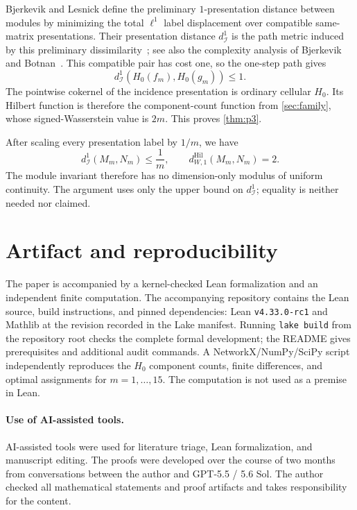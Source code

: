 \documentclass[11pt]{article}
\theoremstyle{definition}
\newcommand{\1}{\mathbf{1}}
\newcommand{\Hil}{\mathrm{Hil}}
\newcommand{\dI}{d_{\mathcal I}^{1}}
\begin{document}
Bjerkevik and Lesnick define the preliminary $1$-presentation distance
between modules by minimizing the total $\ell^1$ label displacement over
compatible same-matrix presentations.  Their presentation distance
$d_{\mathcal I}^{1}$ is the path metric induced by this preliminary
dissimilarity~\cite[Section~3.1 and Definition~3.2]{BjerkevikLesnick2021};
see also the complexity analysis of Bjerkevik and
Botnan~\cite{BjerkevikBotnan2025}.
This compatible pair has cost one, so the one-step path gives
\[
  \dI(H_0(f_m),H_0(g_m))\leq1.
\]
The pointwise cokernel of the incidence presentation is ordinary cellular
$H_0$.  Its Hilbert function is therefore the component-count function from
\cref{sec:family}, whose signed-Wasserstein value is $2m$.  This proves
\cref{thm:p3}.

After scaling every presentation label by $1/m$, we have
\[
  \dI(M_m,N_m)\leq\frac1m,\qquad
  d^{\Hil}_{W,1}(M_m,N_m)=2.
\]
The module invariant therefore has no dimension-only modulus of uniform
continuity.  The argument uses only the upper bound on $\dI$; equality is
neither needed nor claimed.

\section{Artifact and reproducibility}\label{sec:artifact}

The paper is accompanied by a kernel-checked Lean formalization and an
independent finite computation.  The accompanying repository contains the
Lean source, build instructions, and pinned dependencies: Lean
\texttt{v4.33.0-rc1} and Mathlib at the revision recorded in the Lake manifest.
Running \texttt{lake build} from the repository root checks the complete formal
development; the README gives prerequisites and additional audit commands.  A
NetworkX/NumPy/SciPy script independently reproduces the $H_0$ component
counts, finite differences, and optimal assignments for $m=1,\ldots,15$.  The
computation is not used as a premise in Lean.

\paragraph{Use of AI-assisted tools.}
AI-assisted tools were used for literature triage, Lean formalization,
and manuscript editing.  The proofs were developed over the course of two
months from conversations between the author and GPT-5.5 / 5.6 Sol.  The
author checked all mathematical statements and proof artifacts and takes
responsibility for the content.
\end{document}
